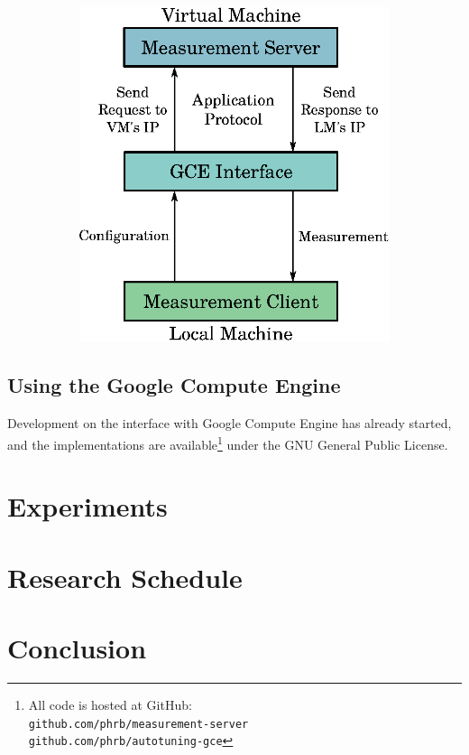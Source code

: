 \documentclass[a4paper, 12pt]{article}
\begin{document}
\begin{figure}[htpb]
\begin{subfigure}{.45\textwidth}
        \includegraphics[scale=.75]{low-level-implementation}
        \caption{}
        \label{fig:low-level}
    \end{subfigure}%
\end{figure}



\subsection{Using the Google Compute Engine} \label{sec:pwork}

Development on the interface with Google Compute Engine
has already started, and the implementations are
available\footnote{All code is hosted at GitHub: \\
\texttt{\scriptsize github.com/phrb/measurement-server} \\
\texttt{\scriptsize github.com/phrb/autotuning-gce}}
under the GNU General Public License.



\section{Experiments} \label{sec:exp}

\section{Research Schedule} \label{sec:sched}

\section{Conclusion} \label{sec:conclusion}



\end{document}
